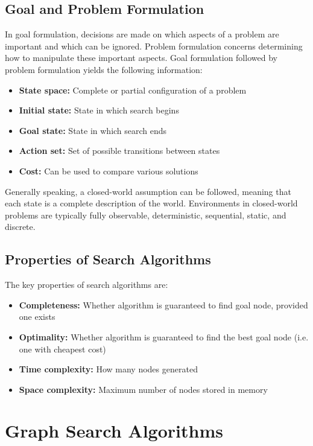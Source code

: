 \documentclass[12pt,titlepage]{article}
\begin{document}
    \subsection{Goal and Problem Formulation}
      In goal formulation, decisions are made on which aspects of a problem are important and which can be ignored. Problem
      formulation concerns determining how to manipulate these important aspects. Goal formulation followed by problem
      formulation yields the following information:
      \begin{itemize}
        \item \textbf{State space:} Complete or partial configuration of a problem
        \item \textbf{Initial state:} State in which search begins
        \item \textbf{Goal state:} State in which search ends
        \item \textbf{Action set:} Set of possible transitions between states
        \item \textbf{Cost:} Can be used to compare various solutions
      \end{itemize}

      Generally speaking, a closed-world assumption can be followed, meaning that each state is a complete description of the world.
      Environments in closed-world problems are typically fully observable, deterministic, sequential, static, and discrete.

    \subsection{Properties of Search Algorithms}
      The key properties of search algorithms are:
      \begin{itemize}
        \item \textbf{Completeness:} Whether algorithm is guaranteed to find goal node, provided one exists
        \item \textbf{Optimality:} Whether algorithm is guaranteed to find the best goal node (i.e. one with cheapest cost)
        \item \textbf{Time complexity:} How many nodes generated
        \item \textbf{Space complexity:} Maximum number of nodes stored in memory
      \end{itemize}

  \section{Graph Search Algorithms}
\end{document}
